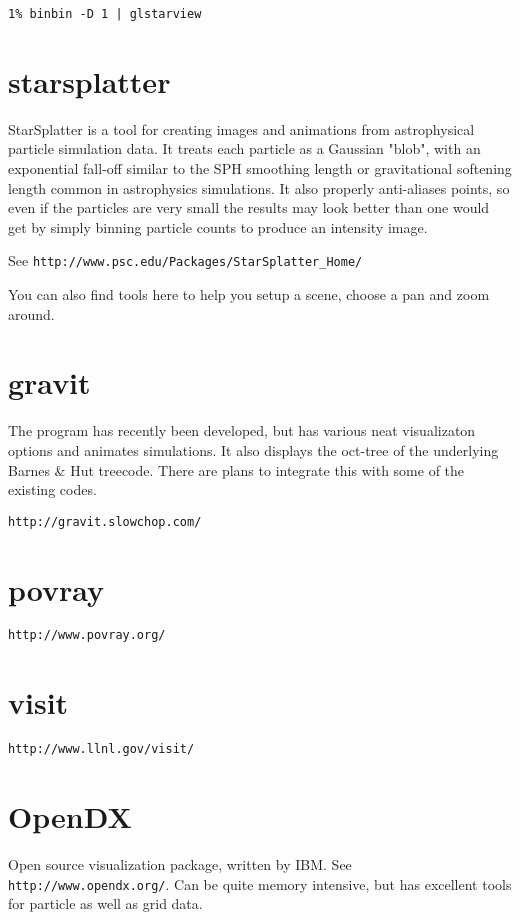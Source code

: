 \footnotesize\begin{verbatim}
1% binbin -D 1 | glstarview
\end{verbatim}\normalsize


\section{starsplatter}

StarSplatter is a tool for creating images and animations from
astrophysical particle simulation data. It treats each particle as a
Gaussian "blob", with an exponential fall-off similar to the SPH
smoothing length or gravitational softening length common in
astrophysics simulations. It also properly anti-aliases points, so
even if the particles are very small the results may look better than
one would get by simply binning particle counts to produce an
intensity image.

See {\tt http://www.psc.edu/Packages/StarSplatter\_Home/}

You can also find tools here to help you setup a scene, choose a pan and
zoom around.

\section{gravit}

The program has recently been developed, but has various neat visualizaton
options and animates simulations. It also displays the oct-tree of the
underlying Barnes \& Hut treecode. There are plans to integrate this with
some of the existing codes.

{\tt http://gravit.slowchop.com/}

\section{povray}

{\tt http://www.povray.org/}

\section{visit}

{\tt http://www.llnl.gov/visit/}

\section{OpenDX}

Open source visualization package, written by IBM. See 
{\tt http://www.opendx.org/}. Can be quite memory intensive, but has
excellent tools for particle as well as grid data.

